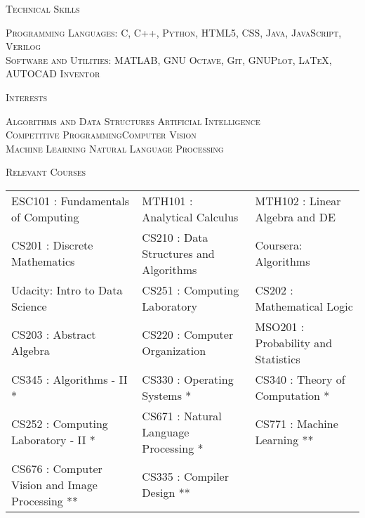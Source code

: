 \documentclass[10pt]{article}
\begin{document}
	
	\vspace{4mm}
		{\centering\Large{\textsc{Technical Skills}}\hrulefill}
	
	\vspace{3mm}

	\normalsize{
	\textsc{Programming Languages:} \textsc{C, C++, Python, HTML5, CSS, Java, JavaScript, Verilog} \\
	\textsc{Software and Utilities:} \textsc{MATLAB, GNU Octave, Git, GNUPlot, \LaTeX, AUTOCAD Inventor}
	}
			
	\vspace{4mm}
		{\centering\Large{\textsc{Interests}}\hrulefill}
	
	\vspace{3mm}
	
	\textsc{Algorithms and Data Structures \hfill Artificial Intelligence \\
	Competitive Programming\hfill Computer Vision\\
	Machine Learning \hfill Natural Language Processing\\}		
			
	\vspace{3mm}
		{\centering\Large{\textsc{Relevant Courses}}\hrulefill}
		
	\vspace{4mm}

	\begin{small}
	
	\begin{tabular}{p{7.2cm} p{5.7cm} p{6cm}}

	{ESC101 : Fundamentals of Computing} & {MTH101 : Analytical Calculus} &{MTH102 : Linear Algebra and DE}\\
	{CS201 : Discrete Mathematics}&{CS210 : Data Structures and Algorithms} & {Coursera: Algorithms }\\
	{Udacity: Intro to Data Science } & {CS251 : Computing Laboratory} &{CS202 : Mathematical Logic} \\ 
	{CS203 : Abstract Algebra} & {CS220 : Computer Organization} & {MSO201 : Probability and Statistics}\\
	{CS345 : Algorithms - II *}&{CS330 : Operating Systems *}&{CS340 : Theory of Computation *}\\
	{CS252 : Computing Laboratory - II *}&{CS671 : Natural Language Processing *} &{CS771 : Machine Learning **}\\
	{CS676 : Computer Vision and Image Processing **}&{CS335 : Compiler Design **}\\

	\end{tabular}
	
	\end{small}
	
\end{document}

